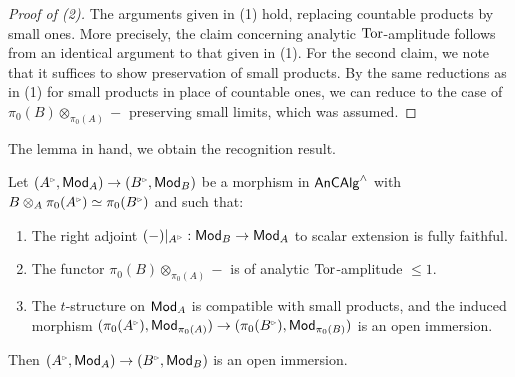 \begin{proof}[Proof of (2)]
    The arguments given in (1) hold, replacing countable products by small ones. More precisely, the claim concerning analytic $\mathrm{Tor}$-amplitude follows from an identical argument to that given in (1). For the second claim, we note that it suffices to show preservation of small products. By the same reductions as in (1) for small products in place of countable ones, we can reduce to the case of $\pi_{0}(B)\otimes_{\pi_{0}(A)}-$ preserving small limits, which was assumed. 
\end{proof}
The lemma in hand, we obtain the recognition result. 
\begin{proposition}\label{prop: open immersion detected on static rings}
    Let $(A^{\tri},\Mod_{A})\to(B^{\tri},\Mod_{B})$ be a morphism in $\mathsf{An}\mathsf{CAlg}^{\wedge}$ with $B\otimes_{A}\pi_{0}(A^{\tri})\simeq\pi_{0}(B^{\tri})$ and such that:
    \begin{enumerate}[label=(\roman*)]
        \item The right adjoint $(-)|_{A^{\tri}}:\Mod_{B}\to\Mod_{A}$ to scalar extension is fully faithful.
        \item The functor $\pi_{0}(B)\otimes_{\pi_{0}(A)}-$ is of analytic $\mathrm{Tor}$-amplitude $\leq 1$.
        \item The $t$-structure on $\mathsf{Mod}_{A}$ is compatible with small products, and the induced morphism $(\pi_{0}(A^{\tri}),\Mod_{\pi_{0}(A)})\to(\pi_{0}(B^{\tri}),\Mod_{\pi_{0}(B)})$ is an open immersion.
    \end{enumerate}
    Then $(A^{\tri},\Mod_{A})\to(B^{\tri},\Mod_{B})$ is an open immersion.
\end{proposition}
